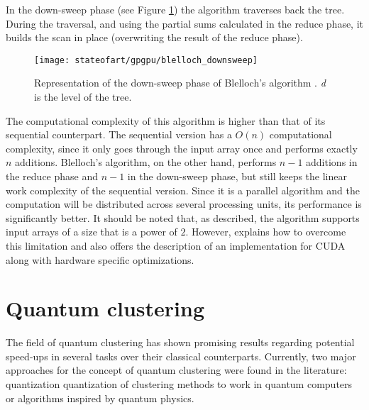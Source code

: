 In the down-sweep phase (see Figure \ref{fig:scan down-sweep}) the algorithm traverses back the tree.
During the traversal, and using the partial sums calculated in the reduce phase, it builds the scan in place (overwriting the result of the reduce phase).

\begin{figure}[hbtp]
\centering
\texttt{[image: stateofart/gpgpu/blelloch\_downsweep]}
\caption{Representation of the down-sweep phase of Blelloch's algorithm \cite{Harris2007}. \emph{d} is the level of the tree.}
\label{fig:scan down-sweep}
\end{figure}

The computational complexity of this algorithm is higher than that of its sequential counterpart.
The sequential version has a $O(n)$ computational complexity, since it only goes through the input array once and performs exactly $n$ additions.
Blelloch's algorithm, on the other hand, performs $n-1$ additions in the reduce phase and $n-1$  in the down-sweep phase, but still keeps the linear work complexity of the sequential version.
Since it is a parallel algorithm and the computation will be distributed across several processing units, its performance is significantly better.
It should be noted that, as described, the algorithm supports input arrays of a size that is a power of $2$.
However, \citet{Harris2007} explains how to overcome this limitation and also offers the description of an implementation for CUDA along with hardware specific optimizations.

%
%

\section{Quantum clustering}
\label{sec:quantum clustering}


The field of quantum clustering has shown promising results regarding potential speed-ups in several tasks over their classical counterparts. 
Currently, two major approaches for the concept of quantum clustering were found in the literature: quantization quantization of clustering methods to work in quantum computers or algorithms inspired by quantum physics.

